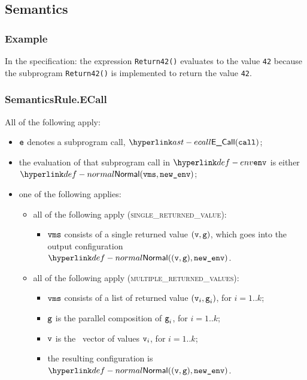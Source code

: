 \subsection{Semantics}
\subsubsection{Example}
In the specification:
the expression \texttt{Return42()} evaluates to the value \texttt{42} because the
subprogram \texttt{Return42()} is implemented to return the value \texttt{42}.

\subsubsection{SemanticsRule.ECall \label{sec:SemanticsRule.ECall}}
All of the following apply:
\begin{itemize}
  \item $\texttt{e}$ denotes a subprogram call, $\ECall(\vcall)$;
  \item the evaluation of that subprogram call in $\env$ is either
  $\Normal(\vms, \newenv)$\ProseOrAbnormal;
  \item one of the following applies:
  \begin{itemize}
    \item all of the following apply (\textsc{single\_returned\_value}):
    \begin{itemize}
      \item $\texttt{vms}$ consists of a single returned value $(\texttt{v},\texttt{g})$,
      which goes into the output configuration $\Normal((\vv, \vg), \newenv)$.
    \end{itemize}

    \item all of the following apply (\textsc{multiple\_returned\_values}):
    \begin{itemize}
      \item $\texttt{vms}$ consists of a list of returned value $(\texttt{v}_i,\texttt{g}_i)$, for $i=1..k$;
      \item $\texttt{g}$ is the parallel composition of $\texttt{g}_i$, for $i=1..k$;
      \item $\texttt{v}$ is the \nativevalue\  vector of values $\texttt{v}_i$, for $i=1..k$;
      \item the resulting configuration is $\Normal((\vv, \vg), \newenv)$.
    \end{itemize}
  \end{itemize}
\end{itemize}

